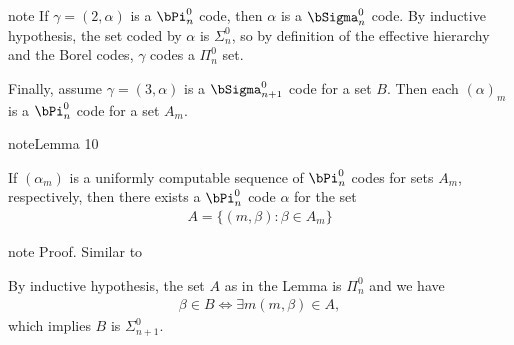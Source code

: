 \documentclass[letterpaper,10pt,english]{jupyterBook}
\begin{document}
\begin{sphinxadmonition}{note}
\sphinxAtStartPar
If \(\gamma = (2, \alpha)\) is a \(\bPi^0_n\) code, then \(\alpha\) is a \(\bSigma^0_n\) code. By inductive hypothesis, the set coded by \(\alpha\) is \(\Sigma^0_n\), so by definition of the effective hierarchy and the Borel codes, \(\gamma\) codes a \(\Pi^0_n\) set.

\sphinxAtStartPar
Finally, assume \(\gamma = (3,\alpha)\) is a \(\bSigma^0_{n+1}\) code for a set \(B\). Then each \((\alpha)_m\) is a \(\bPi^0_n\) code for a set \(A_m\).
\label{codingBorel:lem-Borel-codes-inverse-shift}
\begin{sphinxadmonition}{note}{Lemma 10}



\sphinxAtStartPar
If \((\alpha_m)\) is a uniformly computable sequence of \(\bPi^0_n\) codes for sets \(A_m\), respectively, then there exists a \(\bPi^0_n\) code \(\alpha\) for the set
\begin{equation*}
\begin{split}
    A = \{(m,\beta) \colon \beta \in A_m\}
\end{split}
\end{equation*}\end{sphinxadmonition}

\begin{sphinxadmonition}{note}
\sphinxAtStartPar
Proof. Similar to {\hyperref[\detokenize{codingBorel:lem-Borel-codes-shift}]{}}
\end{sphinxadmonition}

\sphinxAtStartPar
By inductive hypothesis, the set \(A\) as in the Lemma is \(\Pi^0_n\) and we have
\begin{equation*}
\begin{split}
    \beta \in B \iff \exists m (m, \beta )\in A,
\end{split}
\end{equation*}
\sphinxAtStartPar
which implies \(B\) is \(\Sigma^0_{n+1}\).
\end{sphinxadmonition}
\end{document}
